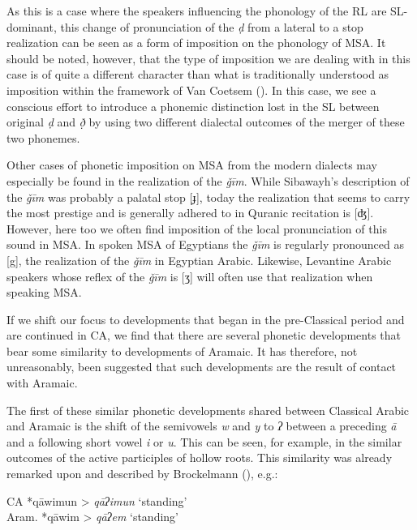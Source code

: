 \documentclass[output=paper]{langsci/langscibook}
\begin{document}
As this is a case where the speakers influencing the phonology of the RL are SL-dominant, this change of pronunciation of the \textit{ḍ} from a lateral to a stop realization can be seen as a form of imposition on the phonology of MSA. It should be noted, however, that the type of imposition we are dealing with in this case is of quite a different character than what is traditionally understood as imposition within the framework of Van Coetsem (\citeyear{VanCoetsem1988,VanCoetsem2000}). In this case, we see a conscious effort to introduce a phonemic distinction lost in the SL between original \textit{ḍ} and \textit{ð̣} by using two different dialectal outcomes of the merger of these two phonemes.

Other cases of phonetic imposition on MSA from the modern dialects may especially be found in the realization of the \textit{ǧīm}. While Sibawayh’s description of the \textit{ǧīm} was probably a palatal stop [ɟ], today the realization that seems to carry the most prestige and is generally adhered to in Quranic recitation is [ʤ]. However, here too we often find imposition of the local pronunciation of this sound in MSA. In spoken MSA of Egyptians the \textit{ǧīm} is regularly pronounced as [g], the realization of the \textit{ǧīm} in Egyptian Arabic. Likewise, Levantine Arabic speakers whose reflex of the \textit{ǧīm} is [ʒ] will often use that realization when speaking MSA.

If we shift our focus to developments that began in the pre-Classical period and are continued in CA, we find that there are several phonetic developments that bear some similarity to developments of Aramaic. It has therefore, not unreasonably, been suggested that such developments are the result of contact with Aramaic.

The first of these similar phonetic developments shared between Classical Arabic and Aramaic is the shift of the semivowels  \textit{w} and \textit{y} to \textit{ʔ} between a preceding \textit{ā} and a following short vowel \textit{i} or \textit{u}. This can be seen, for example, in the similar outcomes of the active participles of hollow roots. This similarity was already remarked upon and described by Brockelmann (\citeyear[138--139]{Brockelmann1908}), e.g.:

\ea
\ea CA *qāwimun > \textit{qāʔimun} ‘standing’\\
\ex Aram. *qāwim > \textit{qāʔem} ‘standing’
\z
\z
\end{document}

